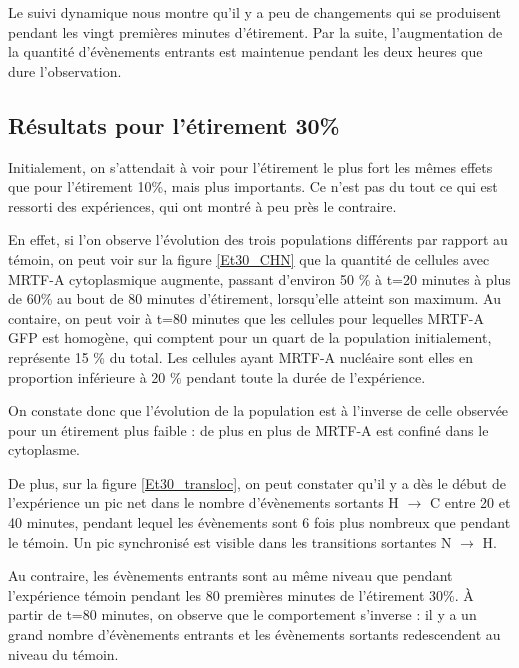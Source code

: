 Le suivi dynamique nous montre qu'il y a peu de changements qui se produisent pendant les vingt premières minutes d'étirement. Par la suite, l'augmentation de la quantité d'évènements entrants est maintenue pendant les deux heures que dure l'observation. 


\subsection{Résultats pour l'étirement 30\%}

Initialement, on s'attendait à voir pour l'étirement le plus fort les mêmes effets que pour l'étirement 10\%, mais plus importants. 
Ce n'est pas du tout ce qui est ressorti des expériences, qui ont montré à peu près le contraire. 

En effet, si l'on observe l'évolution des trois populations différents par rapport au témoin, on peut voir sur la figure \ref{Et30_CHN} que la quantité de cellules avec MRTF-A cytoplasmique augmente, passant d'environ 50 \% à t=20 minutes à plus de 60\% au bout de 80 minutes d'étirement, lorsqu'elle atteint son maximum. 
Au contaire, on peut voir à t=80 minutes que les cellules pour lequelles MRTF-A GFP est homogène, qui comptent pour un quart de la population initialement, représente 15 \% du total. 
Les cellules ayant MRTF-A nucléaire sont elles en proportion inférieure à 20 \% pendant toute la durée de l'expérience. 

On constate donc que l'évolution de la population est à l'inverse de celle observée pour un étirement plus faible : de plus en plus de MRTF-A est confiné dans le cytoplasme. 


De plus, sur la figure \ref{Et30_transloc}, on peut constater qu'il y a dès le début de l'expérience un pic net dans le nombre d'évènements sortants H $\rightarrow$ C entre 20 et 40 minutes, pendant lequel les évènements sont 6 fois plus nombreux que pendant le témoin. Un pic synchronisé est visible dans les transitions sortantes N $\rightarrow$ H. 

Au contraire, les évènements entrants sont au même niveau que pendant l'expérience témoin pendant les 80 premières minutes de l'étirement 30\%. À partir de t=80 minutes, on observe que le comportement s'inverse : il y a un grand nombre d'évènements entrants et les évènements sortants redescendent au niveau du témoin. 

